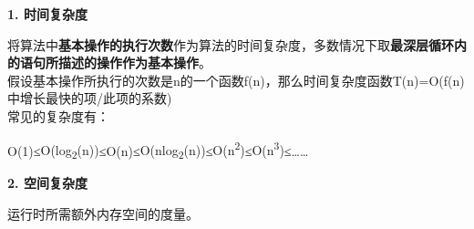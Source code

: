 {\textbf{1. 时间复杂度}}

{将算法中{{\textbf{基本操作的执行次数}}}作为算法的时间复杂度，多数情况下取{\textbf{{最深层循环内的语句所描述的操作作为基本操作}}}。\\
假设基本操作所执行的次数是n的一个函数f(n)，那么时间复杂度函数T(n)=O(f(n)中增长最快的项/此项的系数)\\
常见的复杂度有：}

{O(1)}{≤}{O(log\textsubscript{2}(n))}{≤}{O(n)}{≤}{O(nlog\textsubscript{2}(n))}{≤}{O(n\textsuperscript{2})}{≤}{O(n\textsuperscript{3})}{≤\ldots{}\ldots{}}

{\textbf{2. 空间复杂度}}

{运行时所需额外内存空间的度量。}
